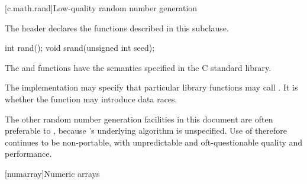 [c.math.rand]{Low-quality random number generation}

\pnum
{}%
\begin{note}
The header 
declares the functions described in this subclause.
\end{note}

%
%
\begin{itemdecl}
int rand();
void srand(unsigned int seed);
\end{itemdecl}

\begin{itemdescr}
\pnum
\effects
The
 and 
functions have the semantics specified in the C standard library.

\pnum
\remarks
The implementation
may specify that particular library functions may call
.
It is 
whether the  function
may introduce data races.
\begin{note}
%
The other random
number generation facilities in this document are often preferable
to , because 's underlying algorithm is unspecified.
Use of  therefore continues to be non-portable, with unpredictable
and oft-questionable quality and performance.
\end{note}
\end{itemdescr}




[numarray]{Numeric arrays}

